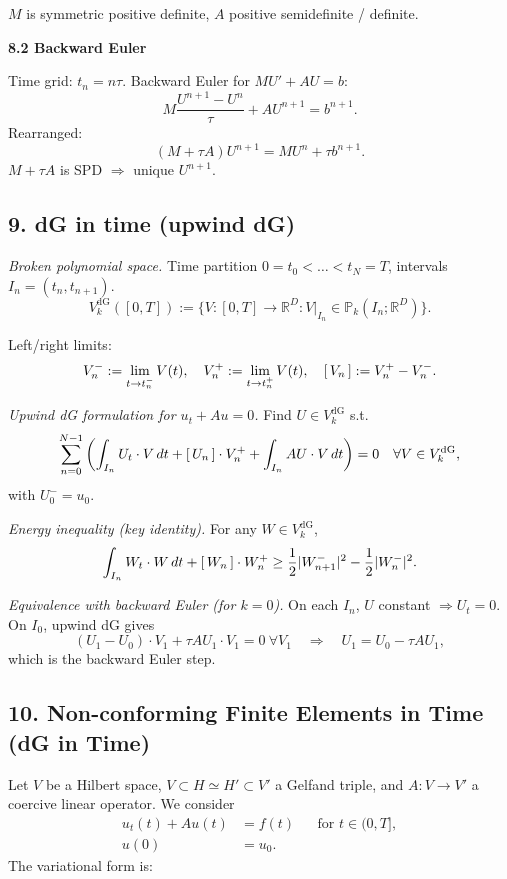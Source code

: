 $M$ is symmetric positive definite, $A$ positive semidefinite / definite.

\textbf{8.2 Backward Euler}

Time grid: $t_n = n\tau$. Backward Euler for $M U'+A U=b$:
\[
    M\frac{U^{n+1}-U^n}{\tau} + A U^{n+1} = b^{n+1}.
\]
Rearranged:
\[
    (M + \tau A)U^{n+1} = M U^n + \tau b^{n+1}.
\]
$M+\tau A$ is SPD $\Rightarrow$ unique $U^{n+1}$.

\subsection*{9. dG in time (upwind dG)}

\emph{Broken polynomial space.}
Time partition $0=t_0<\dots<t_N=T$, intervals $I_n=(t_n,t_{n+1})$.
\[
    V_k^{\mathrm{dG}}([0,T])
    := \{ V: [0,T]\to\mathbb{R}^D : V|_{I_n}\in\mathbb{P}_k(I_n;\mathbb{R}^D)\}.
\]

Left/right limits:
\[
    V_n^- := \lim_{t\to t_n^-}V(t),\quad
    V_n^+ := \lim_{t\to t_n^+}V(t),
    \quad
    \left[\,V_n\,\right] := V_n^+ - V_n^-.
\]

\emph{Upwind dG formulation for $u_t + A u = 0$.}
Find $U\in V_k^{\mathrm{dG}}$ s.t.
\[
    \sum_{n=0}^{N-1}
    \left(
    \int_{I_n} U_t\cdot V\,dt
    + \left[\,U_n\,\right]\cdot V_n^+
    + \int_{I_n} A U\cdot V\,dt
    \right) = 0
    \quad\forall V\in V_k^{\mathrm{dG}},
\]
with $U_0^- = u_0$.

\emph{Energy inequality (key identity).}
For any $W\in V_k^{\mathrm{dG}}$,
\[
    \int_{I_n} W_t\cdot W\,dt + \left[\,W_n\,\right]\cdot W_n^+
    \ge
    \frac12|W_{n+1}^-|^2 - \frac12 |W_n^-|^2.
\]

\emph{Equivalence with backward Euler (for $k=0$).}
On each $I_n$, $U$ constant $\Rightarrow U_t=0$.
On $I_0$, upwind dG gives
\[
    (U_1 - U_0)\cdot V_1 + \tau A U_1\cdot V_1 = 0\ \forall V_1
    \quad\Rightarrow\quad
    U_1 = U_0 - \tau A U_1,
\]
which is the backward Euler step.

\subsection*{10. Non-conforming Finite Elements in Time (dG in Time)}
Let $V$ be a Hilbert space, $V \subset H \simeq H' \subset V'$ a Gelfand triple,
and $A: V \to V'$ a coercive linear operator.
We consider
\begin{align*}
    u_t(t) + A u(t) & = f(t) &  & \text{for } t \in (0,T], \\
    u(0)            & = u_0.
\end{align*}
The variational form is:

